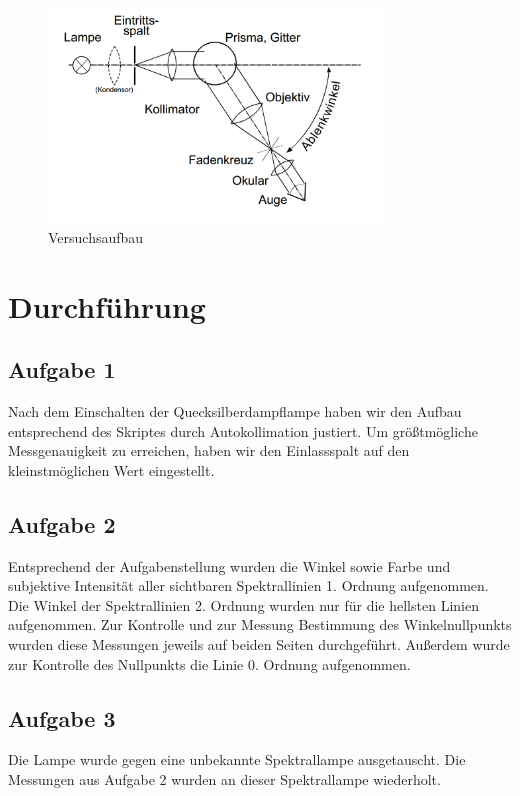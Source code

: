\documentclass[a4paper,german,12pt,smallheadings]{scrartcl}
\begin{document}
\begin{figure}[h!]
    \centering
    \includegraphics[width=0.8\textwidth]{aufbau.png}
    \caption{Versuchsaufbau}
    \label{fig:aufbau}
\end{figure}

\section{Durchführung}
\subsection{Aufgabe 1}

Nach dem Einschalten der Quecksilberdampflampe haben wir den Aufbau
entsprechend des Skriptes durch Autokollimation justiert. Um größtmögliche
Messgenauigkeit zu erreichen, haben wir den Einlassspalt auf den
kleinstmöglichen Wert eingestellt.

\subsection{Aufgabe 2}

Entsprechend der Aufgabenstellung wurden die Winkel sowie Farbe und subjektive
Intensität aller sichtbaren Spektrallinien 1. Ordnung aufgenommen. Die Winkel
der Spektrallinien 2. Ordnung wurden nur für die hellsten Linien aufgenommen.
Zur Kontrolle und zur Messung Bestimmung des Winkelnullpunkts wurden diese
Messungen jeweils auf beiden Seiten durchgeführt. Außerdem wurde zur Kontrolle
des Nullpunkts die Linie 0. Ordnung aufgenommen.

\subsection{Aufgabe 3}

Die Lampe wurde gegen eine unbekannte Spektrallampe ausgetauscht. Die Messungen
aus Aufgabe 2 wurden an dieser Spektrallampe wiederholt.
\end{document}
